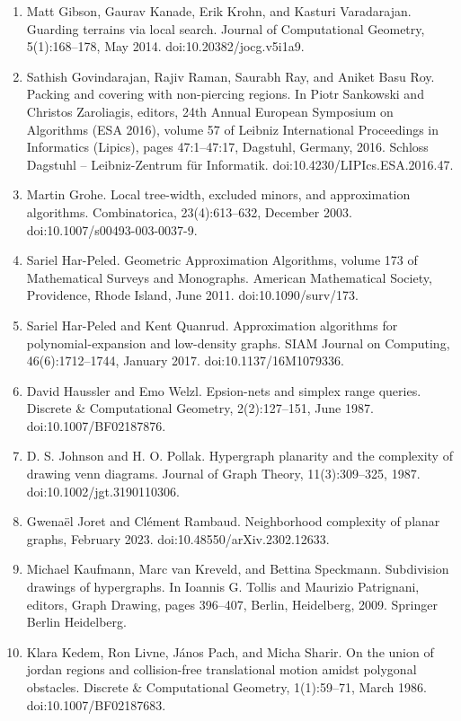 \begin{enumerate}
\item[]  [31]  Matt Gibson, Gaurav Kanade, Erik Krohn, and Kasturi Varadarajan.  Guarding terrains via local search.  Journal of Computational Geometry, 5(1):168–178, May 2014.  doi:10.20382/jocg.v5i1a9.  
\item[]  [32]  Sathish Govindarajan, Rajiv Raman, Saurabh Ray, and Aniket Basu Roy.  Packing and covering with non-piercing regions.  In Piotr Sankowski and Christos Zaroliagis, editors, 24th Annual European Symposium on Algorithms (ESA 2016), volume 57 of Leibniz International Proceedings in Informatics (Lipics), pages 47:1–47:17, Dagstuhl, Germany, 2016. Schloss Dagstuhl – Leibniz-Zentrum für Informatik.  doi:10.4230/LIPIcs.ESA.2016.47.  
\item[]  [33]  Martin Grohe.  Local tree-width, excluded minors, and approximation algorithms.  Combinatorica, 23(4):613–632, December 2003.  doi:10.1007/s00493-003-0037-9.  
\item[]  [34]  Sariel Har-Peled.  Geometric Approximation Algorithms, volume 173 of Mathematical Surveys and Monographs.  American Mathematical Society, Providence, Rhode Island, June 2011.  doi:10.1090/surv/173.  
\item[]  [35]  Sariel Har-Peled and Kent Quanrud.  Approximation algorithms for polynomial-expansion and low-density graphs.  SIAM Journal on Computing, 46(6):1712–1744, January 2017.  doi:10.1137/16M1079336.  
\item[]  [36]  David Haussler and Emo Welzl.  Epsion-nets and simplex range queries.  Discrete \& Computational Geometry, 2(2):127–151, June 1987.  doi:10.1007/BF02187876.  
\item[]  [37]  D. S. Johnson and H. O. Pollak.  Hypergraph planarity and the complexity of drawing venn diagrams.  Journal of Graph Theory, 11(3):309–325, 1987.  doi:10.1002/jgt.3190110306.  
\item[]  [38]  Gwenaël Joret and Clément Rambaud.  Neighborhood complexity of planar graphs, February 2023.  doi:10.48550/arXiv.2302.12633.  
\item[]  [39]  Michael Kaufmann, Marc van Kreveld, and Bettina Speckmann.  Subdivision drawings of hypergraphs.  In Ioannis G. Tollis and Maurizio Patrignani, editors, Graph Drawing, pages 396–407, Berlin, Heidelberg, 2009. Springer Berlin Heidelberg.  
\item[]  [40]  Klara Kedem, Ron Livne, János Pach, and Micha Sharir.  On the union of jordan regions and collision-free translational motion amidst polygonal obstacles.  Discrete \& Computational Geometry, 1(1):59–71, March 1986.  doi:10.1007/BF02187683.  

\end{enumerate}
